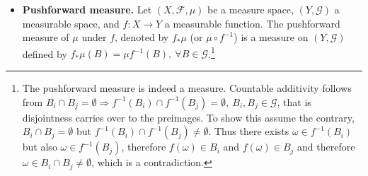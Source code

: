 \documentclass[10pt,a4paper]{article}
\begin{document}
\begin{itemize}
\item 
\textbf{Pushforward measure.} Let $(X, \mathcal F, \mu)$ be a measure space,  $(Y, \mathcal G)$ a measurable space, and $f: X \rightarrow Y$ a measurable function. The pushforward measure of $\mu$ under $f$, denoted by $f_*\mu$ (or $\mu \circ f^{-1}$) is a measure on $(Y, \mathcal G)$ defined by $f_*\mu(B) = \mu f^{-1}(B), ~ \forall B \in \mathcal G$.\footnote{The pushforward measure is indeed a measure. Countable additivity  follows from $B_i \cap B_j  = \emptyset \Rightarrow f^{-1}(B_i) \cap f^{-1}(B_j) = \emptyset, ~B_i, B_j \in \mathcal G$, that is disjointness carries over to the preimages. To show this assume the contrary, $B_i \cap B_j  = \emptyset$ but  $f^{-1}(B_i) \cap f^{-1}(B_j) \neq \emptyset$. Thus there exists $\omega \in f^{-1}(B_i)$ but also $\omega \in f^{-1}(B_j)$, therefore   $f(\omega) \in B_i$ and $f(\omega) \in B_j$  and therefore $\omega \in B_i \cap B_j  \neq \emptyset$, which is a contradiction.}
\end{itemize}
\end{document}
